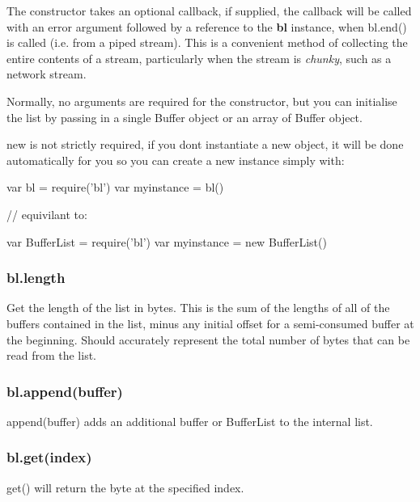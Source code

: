 The constructor takes an optional callback, if supplied, the callback will be called with an error argument followed by a reference to the {\bfseries bl} instance, when {\ttfamily bl.\+end()} is called (i.\+e. from a piped stream). This is a convenient method of collecting the entire contents of a stream, particularly when the stream is {\itshape chunky}, such as a network stream.

Normally, no arguments are required for the constructor, but you can initialise the list by passing in a single {\ttfamily Buffer} object or an array of {\ttfamily Buffer} object.

{\ttfamily new} is not strictly required, if you don\textquotesingle{}t instantiate a new object, it will be done automatically for you so you can create a new instance simply with\+:


\begin{DoxyCode}
var bl = require(\textcolor{stringliteral}{'bl'})
var myinstance = bl()

\textcolor{comment}{// equivilant to:}

var BufferList = require('bl')
var myinstance = new BufferList()
\end{DoxyCode}
 

 \label{_length}%
 \subsubsection*{bl.\+length}

Get the length of the list in bytes. This is the sum of the lengths of all of the buffers contained in the list, minus any initial offset for a semi-\/consumed buffer at the beginning. Should accurately represent the total number of bytes that can be read from the list. 

 \label{_append}%
 \subsubsection*{bl.\+append(buffer)}

{\ttfamily append(buffer)} adds an additional buffer or Buffer\+List to the internal list. 

 \label{_get}%
 \subsubsection*{bl.\+get(index)}

{\ttfamily get()} will return the byte at the specified index. 

 \label{_slice}%

